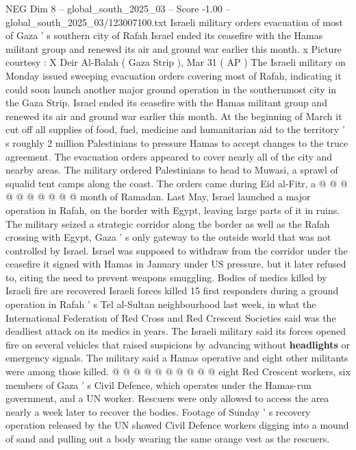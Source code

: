 \begin{textsample}{NEG Dim 8 – global\_south\_2025\_03 – Score -1.00 – global\_south\_2025\_03/123007100.txt}  \label{ex:f8_neg_076}
Israeli military orders evacuation of most of Gaza ' s southern city of Rafah Israel ended its ceasefire with the Hamas militant group and renewed its air and ground war earlier this month. x Picture courtesy : X Deir Al-Balah ( Gaza Strip ), Mar 31 ( AP ) The Israeli military on Monday issued sweeping evacuation orders covering most of Rafah, indicating it could soon launch another major ground operation in the southernmost city in the Gaza Strip.
Israel ended its ceasefire with the Hamas militant group and renewed its air and ground war earlier this month.
At the beginning of March it cut off all supplies of food, fuel, medicine and humanitarian aid to the territory ' s roughly 2 million Palestinians to pressure Hamas to accept changes to the truce agreement.
The evacuation orders appeared to cover nearly all of the city and nearby areas.
The military ordered Palestinians to head to Muwasi, a sprawl of squalid tent camps along the coast.
The orders came during Eid al-Fitr, a @ @ @ @ @ @ @ @ @ @ month of Ramadan.
Last May, Israel launched a major operation in Rafah, on the border with Egypt, leaving large parts of it in ruins.
The military seized a strategic corridor along the border as well as the Rafah crossing with Egypt, Gaza ' s only gateway to the outside world that was not controlled by Israel.
Israel was supposed to withdraw from the corridor under the ceasefire it signed with Hamas in January under US pressure, but it later refused to, citing the need to prevent weapons smuggling.
Bodies of medics killed by Israeli fire are recovered Israeli forces killed 15 first responders during a ground operation in Rafah ' s Tel al-Sultan neighbourhood last week, in what the International Federation of Red Cross and Red Crescent Societies said was the deadliest attack on its medics in years.
The Israeli military said its forces opened fire on several vehicles that raised suspicions by advancing without \textbf{headlights} or emergency signals.
The military said a Hamas operative and eight other militants were among those killed. @ @ @ @ @ @ @ @ @ @ eight Red Crescent workers, six members of Gaza ' s Civil Defence, which operates under the Hamas-run government, and a UN worker.
Rescuers were only allowed to access the area nearly a week later to recover the bodies.
Footage of Sunday ' s recovery operation released by the UN showed Civil Defence workers digging into a mound of sand and pulling out a body wearing the same orange vest as the rescuers.

\end{textsample}

